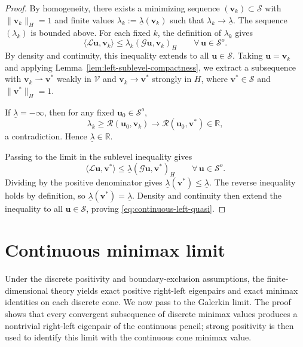 \documentclass[10pt,a4paper]{amsart}
\begin{document}
\begin{proof}
	By homogeneity, there exists a minimizing sequence
	$(\mathbf{v}_k)\subset\mathcal{S}$ with $\|\mathbf{v}_k\|_H=1$ and finite
	values $\lambda_k:=\underline\lambda(\mathbf{v}_k)$ such that
	$\lambda_k\to\underline\lambda$. The sequence $(\lambda_k)$ is bounded above.
	For each fixed $k$, the definition of $\lambda_k$ gives
	\[
	\langle\mathcal{L}\mathbf{u},\mathbf{v}_k\rangle
	\le \lambda_k(\mathcal{G}\mathbf{u},\mathbf{v}_k)_H
	\qquad \forall\,\mathbf{u}\in\mathcal{S}^o.
	\]
	By density and continuity, this inequality extends to all
	$\mathbf{u}\in\mathcal{S}$. Taking $\mathbf{u}=\mathbf{v}_k$ and applying
	Lemma~\ref{lem:left-sublevel-compactness}, we extract a subsequence with
	$\mathbf{v}_k\rightharpoonup\mathbf{v}^*$ weakly in $\mathcal{V}$ and
	$\mathbf{v}_k\to\mathbf{v}^*$ strongly in $H$, where
	$\mathbf{v}^*\in\mathcal{S}$ and $\|\mathbf{v}^*\|_H=1$.
	
	If $\underline\lambda=-\infty$, then for any fixed $\mathbf{u}_0\in\mathcal{S}^o$,
	\[
	\lambda_k \ge \mathcal{R}(\mathbf{u}_0,\mathbf{v}_k)
	\longrightarrow \mathcal{R}(\mathbf{u}_0,\mathbf{v}^*)\in\mathbb{R},
	\]
	a contradiction. Hence $\underline\lambda\in\mathbb{R}$.
	
	Passing to the limit in the sublevel inequality gives
	\[
	\langle\mathcal{L}\mathbf{u},\mathbf{v}^*\rangle
	\le \underline\lambda(\mathcal{G}\mathbf{u},\mathbf{v}^*)_H
	\qquad \forall\,\mathbf{u}\in\mathcal{S}^o.
	\]
	Dividing by the positive denominator gives
	$\underline\lambda(\mathbf{v}^*)\le\underline\lambda$. The reverse inequality
	holds by definition, so $\underline\lambda(\mathbf{v}^*)=\underline\lambda$.
	Density and continuity then extend the inequality to all
	$\mathbf{u}\in\mathcal{S}$, proving \eqref{eq:continuous-left-quasi}.
\end{proof}



\section{Continuous minimax limit}
\label{sec:pde}

Under the discrete positivity and boundary-exclusion assumptions, the
finite-dimensional theory yields exact positive right-left eigenpairs and
exact minimax identities on each discrete cone. We now pass to the Galerkin
limit. The proof shows that every convergent subsequence of discrete minimax
values produces a nontrivial right-left eigenpair of the continuous pencil;
strong positivity is then used to identify this limit with the continuous cone
minimax value.
\end{document}
